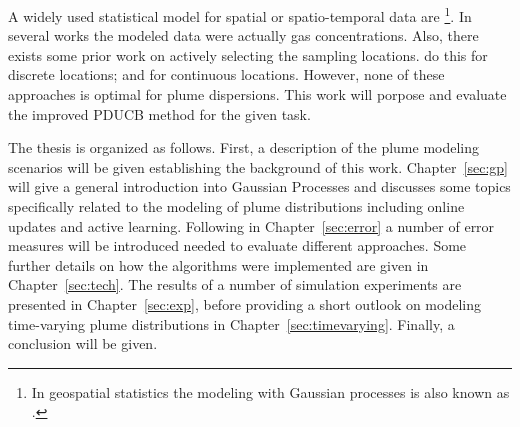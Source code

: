 A widely used statistical model for spatial or spatio-temporal data are 
\footnote{In geospatial statistics the modeling 
    with Gaussian processes is also known as .}. In several 
works \parencite[e.\,g.][]{Stachniss:2008vz, Marchant:2012wb} the modeled data 
were actually gas concentrations. Also, there exists some prior work on actively 
selecting the sampling locations. \Textcite{Stranders:2008wl} do this for 
discrete locations; \textcite{Singh:2010wt} and \textcite{Marchant:2012wb} for 
continuous locations. However, none of these approaches is optimal for plume 
dispersions. This work will porpose and evaluate the improved PDUCB method for 
the given task.

The thesis is organized as follows. First, a description of the plume modeling 
scenarios will be given establishing the background of this work.  
Chapter~\ref{sec:gp} will give a general introduction into Gaussian Processes 
and discusses some topics specifically related to the modeling of plume 
distributions including online updates and active learning. Following in 
Chapter~\ref{sec:error} a number of error measures will be introduced needed to 
evaluate different approaches. Some further details on how the algorithms were 
implemented are given in Chapter~\ref{sec:tech}. The results of a number of 
simulation experiments are presented in Chapter~\ref{sec:exp}, before providing 
a short outlook on modeling time-varying plume distributions in 
Chapter~\ref{sec:timevarying}. Finally, a conclusion will be given.
